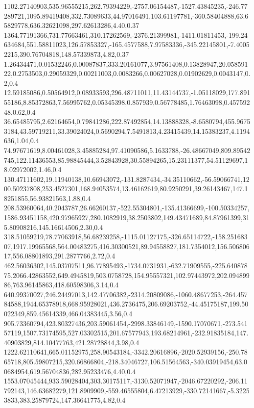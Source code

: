 1102.27140903,535.96555215,262.79394229,-2757.06154487,-1527.43845235,-246.77289721,1095.89419408,332.73089633,44.97016491,103.61197781,-360.58404888,63.65829778,636.32621098,297.62613286,4.40,0.37
1364.77191366,731.77663461,310.17262569,-2376.21399981,-1411.01811453,-199.24634684,551.58811023,126.57853327,-165.4577588,7.97583336,-345.22145801,-7.40052215,390.76704818,148.57339873,4.82,0.37
1.26434471,0.01532246,0.00087837,333.20161077,3.97561408,0.13828947,20.05859122,0.2753503,0.29059329,0.00211003,0.0083266,0.00627028,0.01902629,0.0043147,0.2,0.4
12.59185086,0.50564912,0.08933593,296.48711011,11.43144737,-1.05118029,177.89155186,8.85372863,7.56995762,0.05345398,0.857939,0.56778485,1.76463098,0.45759248,0.62,0.4
36.65485795,2.62164654,0.79841286,222.87492854,14.13888328,-8.6580794,455.96753184,43.59719211,33.39024024,0.5690294,7.5491813,4.23415439,14.15383237,4.1194636,1.04,0.4
74.97671619,8.00461028,3.45885284,97.41090586,5.1633788,-26.48667049,809.89542745,122.11436553,85.98845444,3.52843928,30.55894265,15.23111377,54.51129697,18.02972002,1.46,0.4
130.47111602,19.11940138,10.66943072,-131.8287434,-34.35110662,-56.59066741,1200.50237808,253.4527301,168.94053574,13.46162619,80.9250291,39.26143467,147.18251855,56.93821563,1.88,0.4
208.53960064,40.2043787,26.66260137,-522.55304801,-135.41366699,-100.50334257,1586.93451158,420.97965927,280.1082919,38.2503802,149.43471689,84.87961399,315.80908216,145.16614506,2.30,0.4
318.51059219,78.77063918,56.68239258,-1115.01127175,-326.65114722,-158.25168307,1917.19965568,564.00483275,416.30300521,89.94558827,181.7354012,156.50680617,556.08801893,291.2877766,2.72,0.4
462.56036302,145.03707511,96.77895493,-1734.0731931,-632.71909555,-225.64087875,2066.42863552,649.4945819,503.0758728,154.95557321,102.97443972,202.09489986,763.96145863,418.60598306,3.14,0.4
640.99370027,246.24497013,142.47706382,-2314.20809086,-1060.48677253,-264.45784588,1944.65378918,668.95928021,436.2736475,206.69203752,-44.45175187,199.50022349,859.45614339,466.04383445,3.56,0.4
905.73360794,423.80327436,203.59061454,-2998.33846149,-1590.17070671,-273.54157119,1507.73174595,527.03302515,201.67577943,193.68214961,-232.91835184,147.40903829,814.10477763,421.28728844,3.98,0.4
1222.62110641,665.01152975,258.90543184,-3342.20616896,-2020.52939156,-250.7865718,805.59807215,320.66866804,-218.34046727,106.51564563,-340.03919454,63.00684954,619.56704836,282.95233476,4.40,0.4
1553.07045444,933.59028404,303.30175117,-3130.52071947,-2046.67220292,-206.11792143,146.63682279,121.8909909,-559.46555804,6.47213929,-330.72141667,-5.32253833,383.25879724,147.36641775,4.82,0.4
